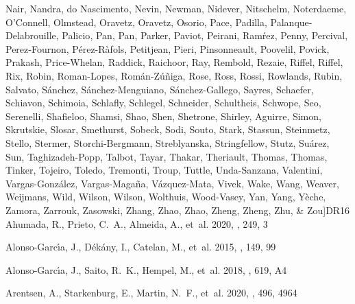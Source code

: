 \documentclass[onecolumn]{aa}
\begin{document}
\begin{thebibliography}{149}
{		{Nair}, {Nandra}, {do Nascimento}, {Nevin}, {Newman}, {Nidever}, {Nitschelm},
		{Noterdaeme}, {O'Connell}, {Olmstead}, {Oravetz}, {Oravetz}, {Osorio},
		{Pace}, {Padilla}, {Palanque-Delabrouille}, {Palicio}, {Pan}, {Pan},
		{Parker}, {Paviot}, {Peirani}, {Ram{\'r}ez}, {Penny}, {Percival},
		{Perez-Fournon}, {P{\'e}rez-R{\`a}fols}, {Petitjean}, {Pieri},
		{Pinsonneault}, {Poovelil}, {Povick}, {Prakash}, {Price-Whelan}, {Raddick},
		{Raichoor}, {Ray}, {Rembold}, {Rezaie}, {Riffel}, {Riffel}, {Rix}, {Robin},
		{Roman-Lopes}, {Rom{\'a}n-Z{\'u}{\~n}iga}, {Rose}, {Ross}, {Rossi},
		{Rowlands}, {Rubin}, {Salvato}, {S{\'a}nchez}, {S{\'a}nchez-Menguiano},
		{S{\'a}nchez-Gallego}, {Sayres}, {Schaefer}, {Schiavon}, {Schimoia},
		{Schlafly}, {Schlegel}, {Schneider}, {Schultheis}, {Schwope}, {Seo},
		{Serenelli}, {Shafieloo}, {Shamsi}, {Shao}, {Shen}, {Shetrone}, {Shirley},
		{Aguirre}, {Simon}, {Skrutskie}, {Slosar}, {Smethurst}, {Sobeck}, {Sodi},
		{Souto}, {Stark}, {Stassun}, {Steinmetz}, {Stello}, {Stermer},
		{Storchi-Bergmann}, {Streblyanska}, {Stringfellow}, {Stutz}, {Su{\'a}rez},
		{Sun}, {Taghizadeh-Popp}, {Talbot}, {Tayar}, {Thakar}, {Theriault}, {Thomas},
		{Thomas}, {Tinker}, {Tojeiro}, {Toledo}, {Tremonti}, {Troup}, {Tuttle},
		{Unda-Sanzana}, {Valentini}, {Vargas-Gonz{\'a}lez}, {Vargas-Maga{\~n}a},
		{V{\'a}zquez-Mata}, {Vivek}, {Wake}, {Wang}, {Weaver}, {Weijmans}, {Wild},
		{Wilson}, {Wilson}, {Wolthuis}, {Wood-Vasey}, {Yan}, {Yang}, {Y{\`e}che},
		{Zamora}, {Zarrouk}, {Zasowski}, {Zhang}, {Zhao}, {Zhao}, {Zheng}, {Zheng},
		{Zhu}, \& {Zou}}]{DR16}
	{Ahumada}, R., {Prieto}, C.~A., {Almeida}, A., {et~al.} 2020, \apjs, 249, 3
	
	{Alonso-Garc{\'\i}a}, J., {D{\'e}k{\'a}ny}, I., {Catelan}, M., {et~al.} 2015,
	\aj, 149, 99
	
	{Alonso-Garc{\'\i}a}, J., {Saito}, R.~K., {Hempel}, M., {et~al.} 2018, \aap,
	619, A4
	
	{Arentsen}, A., {Starkenburg}, E., {Martin}, N.~F., {et~al.} 2020, \mnras, 496,
	4964
	

\end{thebibliography}
\end{document}
